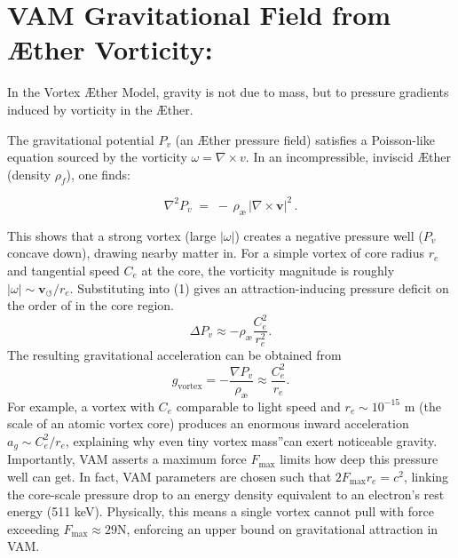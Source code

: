 \documentclass[a4paper,12pt]{article}
\begin{document}
\section*{VAM Gravitational Field from Æther Vorticity:}
In the Vortex Æther Model, gravity is not due to mass, but to pressure gradients induced by vorticity in the Æther.

The gravitational potential $P_v$ (an Æther pressure field) satisfies a Poisson-like equation sourced by the vorticity $\omega=\nabla\times v$. In an incompressible, inviscid Æther (density $\rho_{\scriptscriptstyle\boldsymbol\!f}$), one finds:

\begin{equation}\label{grav-Poisson}
\nabla^2 P_v \;=\; -\,\rho_{\text{\ae}}\,|\nabla\times \mathbf{v}|^2\,.
\end{equation}

This shows that a strong vortex (large $|\omega|$) creates a negative pressure well ($P_v$ concave down), drawing nearby matter in. For a simple vortex of core radius $r_e$ and tangential speed $C_e$ at the core, the vorticity magnitude is roughly $|\omega| \sim \mathbf{v}_{\scriptscriptstyle\boldsymbol{\circlearrowleft}} / r_e$. Substituting into (1) gives an attraction-inducing pressure deficit on the order of in the core region.
\begin{equation}
    \Delta P_v \approx - \rho_\text{\ae} \frac{C_e^2}{r_e^2}.\label{eq:pressure-deficit}
\end{equation}
The resulting gravitational acceleration can be obtained from
\begin{equation}
    g_\text{vortex} = -\frac{\nabla P_v}{\rho_\text{\ae}} \approx \frac{C_e^2}{r_e}.
    \label{eq:gravity_vortex}
\end{equation}
 For example, a vortex with $C_e$ comparable to light speed and $r_e \sim 10^{-15}$ m (the scale of an atomic vortex core) produces an enormous inward acceleration $a_g \sim C_e^2 / r_e$, explaining why even tiny \grqq vortex mass\textquotedblright can exert noticeable gravity. Importantly, VAM asserts a maximum force $F_{\max}$ limits how deep this pressure well can get. In fact, VAM parameters are chosen such that $2 F_{\max} r_e = c^2$, linking the core-scale pressure drop to an energy density equivalent to an electron's rest energy (511 keV). Physically, this means a single vortex cannot pull with force exceeding $F_{\max} \approx 29 \text{N}$, enforcing an upper bound on gravitational attraction in VAM.
\end{document}
